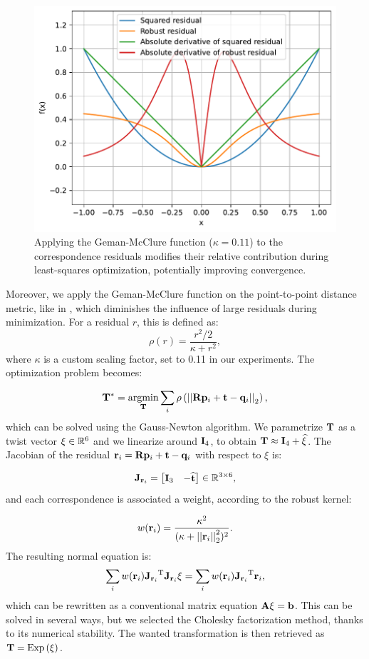 \begin{figure}
	\centering
	\includegraphics[width=0.5\linewidth]{images/robust-fn.pdf}
	\caption[Robust residual function]{Applying the Geman-McClure function ($\kappa=0.11$) to the correspondence residuals modifies their relative contribution during least-squares optimization, potentially improving convergence.}
	\label{fig:robust-residual}
\end{figure}
\newcommand{\residuali}{\vecx{r}_{i}}
\newcommand{\residualjac}{\matx{J}_{\residuali}}
Moreover, we apply the Geman-McClure function  on the point-to-point distance metric, like in \cite{vizzo2023ral}, which diminishes the influence of large residuals during minimization. For a residual $r$, this is defined as:
\begin{equation}
	\rho(r) = \frac{r^2/2}{\kappa + r^2}
	\comma
\end{equation}
where $\kappa$ is a custom scaling factor, set to 0.11 in our experiments. The optimization problem becomes:

\begin{equation}
	\mathbf{T}^* = \underset{\mathbf{T}}{\text{argmin}} \sum_{i}
	\rho \left(\left|\left|{\mathbf{R}\mathbf{p}_i + \mathbf{t} - \mathbf{q}_i}\right|\right|_2 \right)
	\text{,}
\end{equation}
which can be solved using the Gauss-Newton algorithm. We parametrize $\mathbf{T}$ as a twist vector $\xi \in {\mathbb{R}}^6 $ and we linearize around $\mathbf{I}_4$, to obtain $\mathbf{T} \approx \mathbf{I}_4 + \widehat{\xi}$. The Jacobian of the residual $\residuali =\distpqi$ with respect to $\xi$ is:

\begin{equation}
	\residualjac = \begin{bmatrix}
		\matx{I}_3 & -\widehat{\vecx{t}}
	\end{bmatrix} \in \RR^{3\times6}
	\comma
\end{equation}
and each correspondence is associated a weight, according to the robust kernel:

\begin{equation}
	w(\residuali)=\frac{\kappa^2}{(\kappa + \normtwo{\residuali}^2)^2}
	\eqdot
\end{equation}
The resulting normal equation is:
\begin{equation}
	\sum_{i} w(\residuali)\transpose{\residualjac}\residualjac\xi =
	\sum_{i} w(\residuali)\transpose{\residualjac}\residuali
	\comma
\end{equation}
which can be rewritten as a conventional matrix equation $	\mathbf{A}\xi = \mathbf{b}$. This can be solved in several ways, but we selected the Cholesky factorization method, thanks to its numerical stability. The wanted transformation is then retrieved as $\mathbf{T} = \text{Exp}\left({\xi}\right)$.

